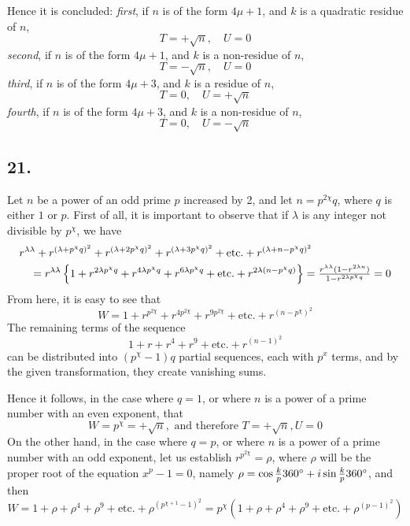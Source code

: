 \documentclass[twoside,12pt, showframe]{memoir}
\let\oldfrac\frac
\def\frac#1#2{\mathchoice{\tfrac{#1}{#2}}{\oldfrac{#1}{#2}}{\genfrac{}{}{}{2}{#1}{#2\mathstrut}}{\genfrac{}{}{}{3}{#1}{#2\mathstrut}}}
\begin{document}
Hence it is concluded:
\textit{first}, if \(n\) is of the form \(4\mu+1\), and \(k\) is a quadratic residue of \(n\),
\[T=+\sqrt{n}, \quad U=0\]
\textit{second}, if \(n\) is of the form \(4\mu+1\), and \(k\) is a non-residue of \(n\),
\[T=-\sqrt{n}, \quad U=0\]
\textit{third}, if \(n\) is of the form \(4\mu+3\), and \(k\) is a residue of \(n\),
\[T=0, \quad U=+\sqrt{n}\]
\textit{fourth}, if \(n\) is of the form \(4\mu+3\), and \(k\) is a non-residue of \(n\),
\[T=0, \quad U=-\sqrt{n}\]
%

\subsection*{21.}

Let \(n\) be a power of an odd prime \(p\) increased by 2, and let \(n = p^{2 \chi} q\), where \(q\) is either \(1\) or \(p\). First of all, it is important to observe that if \(\lambda\) is any integer not divisible by \(p^{\chi}\), we have\clearpage\noindent%
\[\begin{aligned}
& r^{\lambda \lambda}+r^{(\lambda+p^{\chi} q)^{2}}+r^{(\lambda+2 p^{\chi} q)^{2}}+r^{(\lambda+3 p^{\chi} q)^{2}}+\text{etc.}+r^{(\lambda+n-p^{\chi} q)^{2}} \\
& \quad=r^{\lambda \lambda}\left\{1+r^{2 \lambda p^{\chi} q}+r^{4 \lambda p^{\chi} q}+r^{6 \lambda p^{\chi} q}+\text{etc.}+r^{2 \lambda(n-p^{\chi} q)}\right\}=\frac{r^{\lambda \lambda}(1-r^{2 \lambda n})}{1-r^{2 \lambda p^{\chi} q}}=0
\end{aligned}\]
From here, it is easy to see that
\[W=1+r^{p^{2 \chi}}+r^{4 p^{2 \chi}}+r^{9 p^{2 \chi}}+\text{etc.}+r^{(n-p^{\chi})^{2}}\]
The remaining terms of the sequence
\[1+r+r^{4}+r^{9}+\text{etc.}+r^{(n-1)^{2}}\]
can be distributed into \((p^{\chi}-1) q\) partial sequences, each with \(p^{x}\) terms, and by the given transformation, they create vanishing sums.
%

Hence it follows, in the case where \(q=1\), or where \(n\) is a power of a prime number with an even exponent, that
\[W=p^{\chi}=+\sqrt{n}, \text{ and therefore } T=+\sqrt{n}, U=0\]
On the other hand, in the case where \(q=p\), or where \(n\) is a power of a prime number with an odd exponent, let us establish \(r^{p^{2\chi}}=\rho\), where \(\rho\) will be the proper root of the equation \(x^{p}-1=0\), namely \(\rho=\cos \frac{k}{p} 360^{\circ}+i \sin \frac{k}{p} 360^{\circ}\), and then
\[W=1+\rho+\rho^{4}+\rho^{9}+\text{etc.}+\rho^{(p^{\chi+1}-1)^{2}}=p^{\chi}(1+\rho+\rho^{4}+\rho^{9}+\text{etc.}+\rho^{(p-1)^{2}})\]
%
\end{document}
